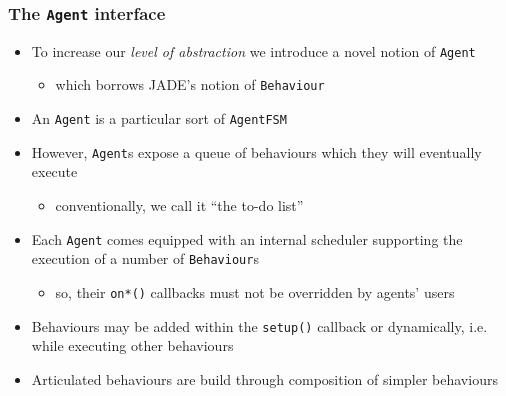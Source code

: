 \documentclass[presentation]{beamer}\mode<presentation>{\usetheme{AMSCesenaPurpleAndGold}}
\begin{document}
\begin{frame}[allowframebreaks]
    \frametitle{The \texttt{Agent} interface}

    \begin{itemize}
        \item To increase our \emph{level of abstraction} we introduce a novel notion of \alert{\texttt{Agent}}
        \begin{itemize}
            \item which borrows JADE's notion of \texttt{\alert{Behaviour}}
        \end{itemize}
    \end{itemize}

    \bigskip

    

    \framebreak

    \begin{itemize}
        \item An \texttt{Agent} is a particular sort of \texttt{AgentFSM}

        \bigskip

        \item However, \texttt{Agent}s expose a \alert{queue} of \alert{behaviours} which they will eventually execute
        \begin{itemize}
            \item conventionally, we call it ``the \alert{to-do list}''
        \end{itemize}

        \bigskip

        \item Each \texttt{Agent} comes equipped with an \alert{internal scheduler} supporting the execution of a number of \texttt{Behaviour}s
        \begin{itemize}
            \item so, their \texttt{on*()} callbacks must not be overridden by agents' users

        \end{itemize}

        \bigskip

        \item Behaviours may be added within the \alert{\texttt{setup()}} callback or dynamically, i.e. while executing other behaviours

        \bigskip

        \item Articulated behaviours are build through \alert{composition} of simpler behaviours

    \end{itemize}

\end{frame}
\end{document}
